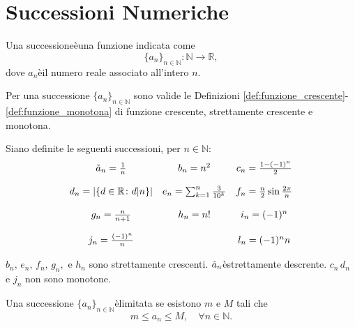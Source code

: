 \section{Successioni Numeriche}
\begin{definition}[Successione]
    Una successioneèuna funzione indicata come
    \begin{equation*}
        \{a_n\}_{n\in\mathbb N}\colon\mathbb N\rightarrow\mathbb R,
    \end{equation*}
    dove $a_n$èil numero reale associato all'intero $n$.
\end{definition}

\begin{remark}
    Per una successione $\{a_n\}_{n\in\mathbb N}$ sono valide le Definizioni \ref{def:funzione_crescente}-\ref{def:funzione_monotona} di funzione crescente, strettamente crescente e monotona.
\end{remark}

Siano definite le seguenti successioni, per $n\in\mathbb N$:
\begin{equation*}
    \begin{matrix}
        \Tilde{a}_n=\frac{1}{n} & b_n = n^2 & c_n = \frac{1-(-1)^n}{2}\\
        &&\\
        d_n=|\{d\in\mathbb R\colon d|n\}| & e_n=\sum_{k=1}^n\frac{3}{10^k} & f_n=\frac{n}{2}\sin\frac{2\pi}{n}\\
        &&\\
        g_n= \frac{n}{n+1} & h_n=n! & i_n= (-1)^n\\
        &&\\
        j_n=\frac{(-1)^n}{n} &  & l_n = (-1)^n n
    \end{matrix}
\end{equation*}

\begin{remark}
    $b_n,\, e_n,\, f_n,\, g_n,$ e $h_n$ sono strettamente crescenti. $\Tilde{a}_n$èstrettamente descrente. $c_n\, d_n$ e $j_n$ non sono monotone.
\end{remark}

\begin{definition}
    Una successione $\{a_n\}_{n\in\mathbb N}$èlimitata se esistono $m$ e $M$ tali che
    \begin{equation*}
        m\leq a_n\leq M,\quad \forall n\in\mathbb N.
    \end{equation*}
\end{definition}

